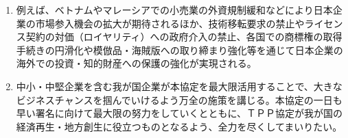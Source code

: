 \begin {enumerate}
\item 例えば、ベトナムやマレーシアでの小売業の外資規制緩和などにより日本企業の市場参入機会の拡大が期待されるほか、技術移転要求の禁止やライセンス契約の対価（ロイヤリティ）への政府介入の禁止、各国での商標権の取得手続きの円滑化や模倣品・海賊版への取り締まり強化等を通じて日本企業の海外での投資・知的財産への保護の強化が実現される。

\item 中小・中堅企業を含む我が国企業が本協定を最大限活用することで、大きなビジネスチャンスを掴んでいけるよう万全の施策を講じる。本協定の一日も早い署名に向けて最大限の努力をしていくとともに、ＴＰＰ協定が我が国の経済再生・地方創生に役立つものとなるよう、全力を尽くしてまいりたい。
\end {enumerate}



